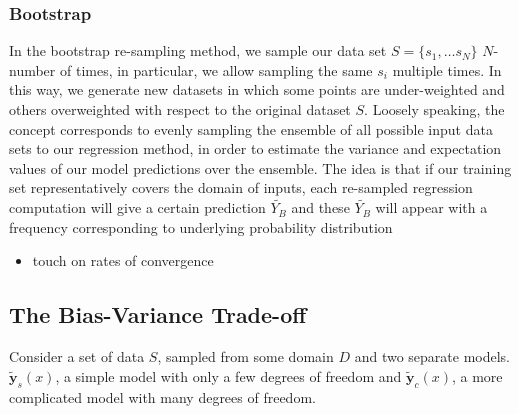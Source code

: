 \documentclass[reprint, english, nofootinbib]{revtex4-2}
\begin{document}
        \subsubsection{Bootstrap}
            \noindent
            In the bootstrap re-sampling method, we sample our data set $S = \{s_1, \dots s_N\}$ $N$-number of times, in particular, we allow sampling the same $s_i$ multiple times. In this way, we generate new datasets in which some points are under-weighted and others overweighted with respect to the original dataset $S$. Loosely speaking, the concept corresponds to evenly sampling the ensemble of all possible input data sets to our regression method, in order to estimate the variance and expectation values of our model predictions over the ensemble. The idea is that if our training set representatively covers the domain of inputs, each re-sampled regression computation will give a certain prediction $\tilde{Y_{B}}$ and these $\tilde{Y_{B}}$ will appear with a frequency corresponding to underlying probability distribution

            \begin{itemize}
                \item touch on rates of convergence
            \end{itemize}

    \subsection{The Bias-Variance Trade-off}
        \noindent
        Consider a set of data $S$, sampled from some domain $D$ and two separate models. $\tilde{\mathbf y}_s(x)$, a simple model with only a few degrees of freedom and $\tilde{\mathbf y}_c(x)$, a more complicated model with many degrees of freedom.
\end{document}
